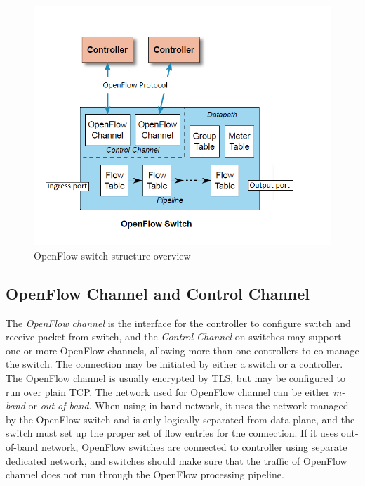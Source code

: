 \begin{figure}[H]
\begin{center} 
\includegraphics[width=1.1\textwidth]{figures/openflow_switch_overview.PNG}
\end{center}
\caption{OpenFlow switch structure overview}
\label{OF_OV}
\end{figure} 

\subsection{OpenFlow Channel and Control Channel}
\label{OpenFlow Channel and Control Channel}
The \textit{OpenFlow channel} is the interface for the controller to configure switch and receive packet from switch, and the \textit{Control Channel} on switches may support one or more OpenFlow channels, allowing more than one controllers to co-manage the switch. The connection may be initiated by either a switch or a controller. The OpenFlow channel is usually encrypted by TLS, but may be configured to run over plain TCP. The network used for OpenFlow channel can be either \textit{in-band} or \textit{out-of-band}. When using in-band network, it uses the network managed by the OpenFlow switch and is only logically separated from data plane, and the switch must set up the proper set of flow entries for the connection. If it uses out-of-band network, OpenFlow switches are connected to controller using separate dedicated network, and switches should make sure that the traffic of OpenFlow channel does not run through the OpenFlow processing pipeline. \cite{OF_SPEC}

